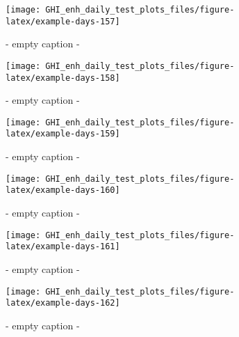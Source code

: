 \documentclass[
  10pt,
  a4paper,oneside]{article}
\begin{document}
\begin{figure}[H]

{\centering \texttt{[image: GHI\_enh\_daily\_test\_plots\_files/figure-latex/example-days-157]} 

}

\caption{ - empty caption - }\label{fig:example-days-157}
\end{figure}

\begin{figure}[H]

{\centering \texttt{[image: GHI\_enh\_daily\_test\_plots\_files/figure-latex/example-days-158]} 

}

\caption{ - empty caption - }\label{fig:example-days-158}
\end{figure}

\begin{figure}[H]

{\centering \texttt{[image: GHI\_enh\_daily\_test\_plots\_files/figure-latex/example-days-159]} 

}

\caption{ - empty caption - }\label{fig:example-days-159}
\end{figure}

\begin{figure}[H]

{\centering \texttt{[image: GHI\_enh\_daily\_test\_plots\_files/figure-latex/example-days-160]} 

}

\caption{ - empty caption - }\label{fig:example-days-160}
\end{figure}

\begin{figure}[H]

{\centering \texttt{[image: GHI\_enh\_daily\_test\_plots\_files/figure-latex/example-days-161]} 

}

\caption{ - empty caption - }\label{fig:example-days-161}
\end{figure}

\begin{figure}[H]

{\centering \texttt{[image: GHI\_enh\_daily\_test\_plots\_files/figure-latex/example-days-162]} 

}

\caption{ - empty caption - }\label{fig:example-days-162}
\end{figure}
\end{document}
